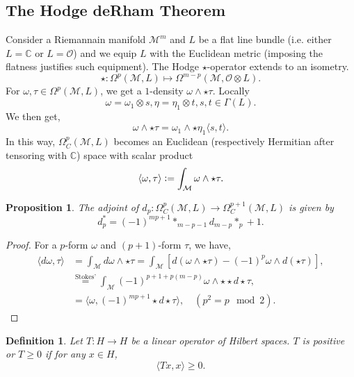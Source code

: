 \documentclass[8pt]{article}
\newtheorem{proposition}{Proposition}[section]
\newtheorem{definition}{Definition}[section]
\newcommand{\defeq}{\vcentcolon=}
\newcommand{\C}[0]{\mathbb{C}}
\newcommand{\M}[0]{\mathcal{M}}
\begin{document}
\subsection{The Hodge deRham Theorem}
Consider a Riemannain manifold $\M^m$ and $L$ be a flat line bundle (i.e. either $L=\C$ or $L=\mathcal{O}$) and we equip $L$ with the Euclidean metric (imposing the flatness justifies such equipment). The Hodge $\star$-operator extends to an isometry.
\begin{equation*}
  \star:\Omega^p(\M,L)\mapsto \Omega^{m-p}(\M,\mathcal{O}\otimes L).
\end{equation*}
For $\omega,\tau\in\Omega^p(\M,L)$, we get a $1$-density $\omega\wedge\star\tau$. Locally 
\begin{equation*}
\omega=\omega_1\otimes s,\eta=\eta_1\otimes t, s,t\in\Gamma(L).
\end{equation*}
We then get,
\begin{equation*}
\omega\wedge\star\tau = \omega_1\wedge\star\eta_1\langle s,t\rangle.
\end{equation*}
In this way, $\Omega^p_{C}(\M,L)$ becomes an Euclidean (respectively Hermitian after tensoring with $\C$) space with scalar product 
\begin{equation*}
\langle \omega,\tau\rangle \defeq\int_\M\omega\wedge\star\tau.
\end{equation*}
\begin{proposition}
  The adjoint of $d_p:\Omega^p_C(\M,L)\to\Omega^{p+1}_C(\M,L)$ is given by 
  \begin{equation*}
  d_p^*=(-1)^{mp+1}\ast_{m-p-1}d_{m-p}\ast_p+1.
  \end{equation*}
\end{proposition}
\begin{proof}
  For a $p$-form $\omega$ and $(p+1)$-form $\tau$, we have,
  \begin{align*}
    \langle d\omega,\tau\rangle &= \int_\M d\omega\wedge\star\tau = \int_\M[d(\omega\wedge\star\tau)-(-1)^p\omega\wedge d(\star\tau)],\\
    & \stackrel{\text{Stokes'}}{=}\int_\M (-1)^{p+1+p(m-p)}\omega\wedge\star\star d\star\tau,\\
    & = \langle\omega,(-1)^{mp+1}\star d\star\tau\rangle, \quad(p^2=p\mod{2}).
  \end{align*}
\end{proof}
\begin{definition}
  Let $T:H\to H$ be a linear operator of Hilbert spaces. $T$ is positive or $T\geq0$ if for any $x\in H$, 
  \begin{equation*}
    \langle Tx,x\rangle \geq0.
  \end{equation*}
\end{definition}
\end{document}
